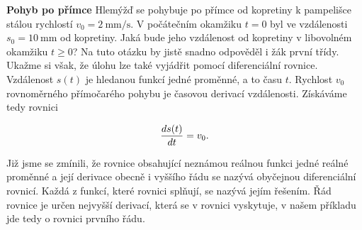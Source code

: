 \begin{mdframed}[style=mdexam]
  \begin{example}\label{mai:exam084}
    \textbf{Pohyb po přímce}\newline
    Hlemýžď se pohybuje po přímce od kopretiny k pampelišce stálou rychlostí \(v_0 =
    \SI{2}{\mm\per\s}\). V počátečním okamžiku \(t = 0\) byl ve vzdálenosti \(s_0 = \SI{10}{\mm}\)
    od kopretiny. Jaká bude jeho vzdálenost od kopretiny v libovolném okamžiku \(t\geq0\)? Na tuto
    otázku by jistě snadno odpověděl i žák první třídy. Ukažme si však, že úlohu lze také vyjádřit
    pomocí diferenciální rovnice. Vzdálenost \(s(t)\) je hledanou funkcí jedné proměnné, a to času
    \(t\). Rychlost \(v_0\) rovnoměrného přímočarého pohybu je časovou derivací vzdálenosti.
    Získáváme tedy rovnici

    {\centering
     \captionsetup{type=figure}
     \label{mai:fig055}
    \par}
    
    \begin{equation}\label{mai:eq076}
      \dfrac{d s(t)}{d t} = v_0.
    \end{equation}

    Již jsme se zmínili, že rovnice obsahující neznámou reálnou funkci jedné reálné proměnné a její
    derivace obecně i vyššího řádu se nazývá obyčejnou diferenciální rovnicí. Každá z funkcí, které
    rovnici splňují, se nazývá jejím řešením. Řád rovnice je určen nejvyšší derivací, která se v
    rovnici vyskytuje, v našem příkladu jde tedy o rovnici prvního řádu.

    {\centering
     \captionsetup{type=figure}
     \label{mai:fig054}
    \par}
    

\end{example}
\end{mdframed}
